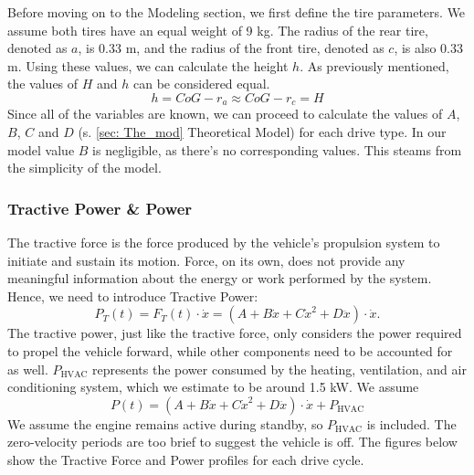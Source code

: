 Before moving on to the Modeling section, we first define the tire parameters. We assume both tires have an equal weight of 9 kg. The radius of the rear tire, denoted as $a$, is 0.33 m, and the radius of the front tire, denoted as $c$, is also 0.33 m. Using these values, we can calculate the height $h$. As previously mentioned, the values of $H$ and $h$ can be considered equal.
\begin{equation*}
	h = CoG - r_a \approx CoG - r_c = H
\end{equation*} 
Since all of the variables are known, we can proceed to calculate the values of $A$, $B$, $C$ and $D$ (s. \ref{sec: The_mod} Theoretical Model) for each drive type. In our model value $B$ is negligible, as there's no corresponding values. This steams from the simplicity of the model.
\subsubsection*{Tractive Power \& Power}
	The tractive force is the force produced by the vehicle's propulsion system to initiate and sustain its motion. Force, on its own, does not provide any meaningful information about the energy or work performed by the system. Hence, we need to introduce Tractive Power:
	\begin{equation*}
		P_T(t) = F_T(t)\cdot\dot x = \left( A + B\dot x + C\dot x^2 + D\ddot x \right)\cdot\dot x.
	\end{equation*}
	The tractive power, just like the tractive force, only considers the power required to propel the vehicle forward, while other components need to be accounted for as well.
	$P_{\text{HVAC}}$ represents the power consumed by the heating, ventilation, and air conditioning system, which we estimate to be around 1.5 kW. We assume 
	\begin{equation*}
		P(t) = \left( A + B\dot x + C\dot x^2 + D\ddot x\right)\cdot\dot x + P_{\text{HVAC}}
	\end{equation*}
	We assume the engine remains active during standby, so $P_{\text{HVAC}}$ is included. The zero-velocity periods are too brief to suggest the vehicle is off.
	The figures below show the Tractive Force and Power profiles for each drive cycle.
